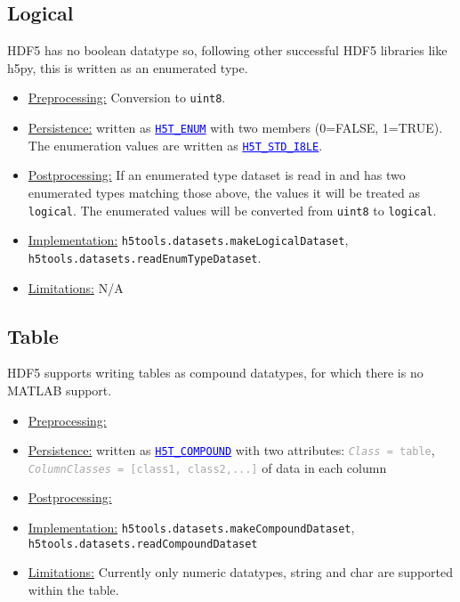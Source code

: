 \documentclass[11pt]{exam}
\newcommand\myurl[1]{\textcolor{blue}{\underline{#1}}}
\newcommand\myfcn[1]{\colorbox{codegray}{\textcolor{codeblue}{\texttt{#1}}}}
\newcommand\hdftype[1]{\texttt{\myurl{#1}}}
\newcommand\myatt[2]{\textcolor{darkgray}{\texttt{\textit{#1} = #2}}}
\begin{document}
		\subsection{Logical}
		\noindent HDF5 has no boolean datatype so, following other successful HDF5 libraries like h5py, this is written as an enumerated type.
		\begin{itemize}
			\item \underline{Preprocessing:} Conversion to \texttt{uint8}.
			\item \underline{Persistence:} written as \myurl{\texttt{H5T\_ENUM}} with two members (0=FALSE, 1=TRUE). The enumeration values are written as \hdftype{H5T\_STD\_I8LE}.
			\item \underline{Postprocessing:} If an enumerated type dataset is read in and has two enumerated types matching those above, the values it will be treated as \texttt{logical}. The enumerated values will be converted from \texttt{uint8} to \texttt{logical}. 
			\item \underline{Implementation:} \myfcn{h5tools.datasets.makeLogicalDataset}, \myfcn{h5tools.datasets.readEnumTypeDataset}.
			\item \underline{Limitations:} N/A
		\end{itemize}
		
		\subsection{Table}
		\noindent HDF5 supports writing tables as compound datatypes, for which there is no MATLAB support.
		\begin{itemize}
			\item \underline{Preprocessing:} 
			\item \underline{Persistence:} written as \myurl{\texttt{H5T\_COMPOUND}} with two attributes: \myatt{Class}{table}, \myatt{ColumnClasses}{[class1, class2,...]} of data in each column
			\item \underline{Postprocessing:} 
			\item \underline{Implementation:} \myfcn{h5tools.datasets.makeCompoundDataset}, \\\myfcn{h5tools.datasets.readCompoundDataset}
			\item \underline{Limitations:} Currently only numeric datatypes, string and char are supported within the table.
		\end{itemize}
		
\end{document}
